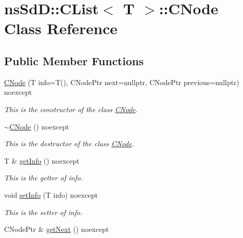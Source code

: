 \hypertarget{classnsSdD_1_1CList_1_1CNode}{\section{ns\+Sd\+D\+:\+:C\+List$<$ T $>$\+:\+:C\+Node Class Reference}
\label{classnsSdD_1_1CList_1_1CNode}
}
\subsection*{Public Member Functions}
\begin{DoxyCompactItemize}
\item 
\hyperlink{classnsSdD_1_1CList_1_1CNode_a9a85f6b5af38dac3d1e69d022b98de21}{C\+Node} (T info=T(), C\+Node\+Ptr next=nullptr, C\+Node\+Ptr previous=nullptr) noexcept
\begin{DoxyCompactList}\small\item\em This is the constructor of the class \hyperlink{classnsSdD_1_1CList_1_1CNode}{C\+Node}. \end{DoxyCompactList}\item 
\hypertarget{classnsSdD_1_1CList_1_1CNode_acf1b1263d8c103aa371da1ca5cdc2f0f}{\hyperlink{classnsSdD_1_1CList_1_1CNode_acf1b1263d8c103aa371da1ca5cdc2f0f}{$\sim$\+C\+Node} () noexcept}\label{classnsSdD_1_1CList_1_1CNode_acf1b1263d8c103aa371da1ca5cdc2f0f}

\begin{DoxyCompactList}\small\item\em This is the destructor of the class \hyperlink{classnsSdD_1_1CList_1_1CNode}{C\+Node}. \end{DoxyCompactList}\item 
\hypertarget{classnsSdD_1_1CList_1_1CNode_a7eb600f01f6f9586fc0a7abcf91623a7}{T \& \hyperlink{classnsSdD_1_1CList_1_1CNode_a7eb600f01f6f9586fc0a7abcf91623a7}{get\+Info} () noexcept}\label{classnsSdD_1_1CList_1_1CNode_a7eb600f01f6f9586fc0a7abcf91623a7}

\begin{DoxyCompactList}\small\item\em This is the getter of info. \end{DoxyCompactList}\item 
void \hyperlink{classnsSdD_1_1CList_1_1CNode_a61db31050887ed51b55b0cc954759c28}{set\+Info} (T info) noexcept
\begin{DoxyCompactList}\small\item\em This is the setter of info. \end{DoxyCompactList}\item 
\hypertarget{classnsSdD_1_1CList_1_1CNode_a1ef338c7389eac11c0ac797bad89e054}{C\+Node\+Ptr \& \hyperlink{classnsSdD_1_1CList_1_1CNode_a1ef338c7389eac11c0ac797bad89e054}{get\+Next} () noexcept}\label{classnsSdD_1_1CList_1_1CNode_a1ef338c7389eac11c0ac797bad89e054}


\end{DoxyCompactItemize}
